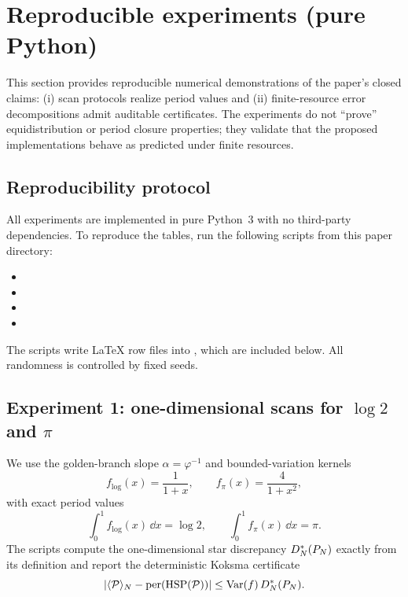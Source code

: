 
\section{Reproducible experiments (pure Python)}
\label{sec:reproducible_experiments}

This section provides reproducible numerical demonstrations of the paper's closed claims:
(i) scan protocols realize period values and (ii) finite-resource error decompositions admit auditable certificates.
The experiments do not ``prove'' equidistribution or period closure properties; they validate that the proposed implementations behave as predicted under finite resources.

\subsection{Reproducibility protocol}
\label{sec:reproducibility_protocol}

All experiments are implemented in pure Python~3 with no third-party dependencies.
To reproduce the tables, run the following scripts from this paper directory:
\begin{itemize}
\item {}
\item {}
\item {}
\item {}
\end{itemize}
The scripts write \LaTeX{} row files into , which are included below.
All randomness is controlled by fixed seeds.

\subsection{Experiment 1: one-dimensional scans for \texorpdfstring{$\log 2$}{log 2} and \texorpdfstring{$\pi$}{pi}}
\label{sec:exp_1d}

We use the golden-branch slope $\alpha=\varphi^{-1}$ and bounded-variation kernels
\[
f_{\log}(x)=\frac{1}{1+x},
\qquad
f_{\pi}(x)=\frac{4}{1+x^2},
\]
with exact period values
\[
\int_0^1 f_{\log}(x)\,\dd x=\log 2,
\qquad
\int_0^1 f_{\pi}(x)\,\dd x=\pi.
\]
The scripts compute the one-dimensional star discrepancy $D_N^\ast(P_N)$ exactly from its definition and report the deterministic Koksma certificate
\[
|\langle \mathcal{P} \rangle_N-\mathrm{per}(\mathrm{HSP}(\mathcal{P}))|\le \mathrm{Var}(f)\,D_N^\ast(P_N).
\]

